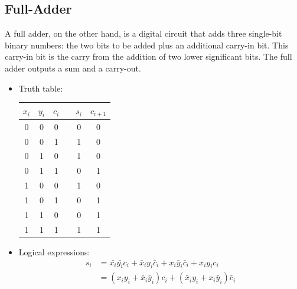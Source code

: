 \documentclass[12pt,openany]{book}
\begin{document}
			      	\subsection{Full-Adder}
			      	A full adder, on the other hand, is a digital circuit that adds three single-bit binary numbers: the two bits to be added plus an additional carry-in bit. This carry-in bit is the carry from the addition of two lower significant bits. The full adder outputs a sum and a carry-out.
			      	
			      	\begin{itemize}
			      		\item[] Truth table:
			      		      \begin{center}
			      		      	\begin{tabular}{cccc|cc}
			      		      		\( x_i \) & \( y_i \) & \( c_i \) &   & \( s_i \) & \( c_{i+1} \) \\
			      		      		\hline
			      		      		0         & 0         & 0         &   & 0         & 0             \\
			      		      		0         & 0         & 1         &   & 1         & 0             \\
			      		      		0         & 1         & 0         &   & 1         & 0             \\
			      		      		0         & 1         & 1         &   & 0         & 1             \\
			      		      		1         & 0         & 0         &   & 1         & 0             \\
			      		      		1         & 0         & 1         &   & 0         & 1             \\
			      		      		1         & 1         & 0         &   & 0         & 1             \\
			      		      		1         & 1         & 1         &   & 1         & 1             \\
			      		      	\end{tabular}
			      		      \end{center}
			      		\item[] Logical expressions:
			      		      \begin{align*}
			      		      	s_i     & = \bar{x_i}\bar{y_i} c_i + \bar{x}_i y_i \bar{c}_i + x_i \bar{y}_i \bar{c}_i + x_i y_i c_i \\
			      		      	        & = (x_i y_i + \bar{x}_i \bar{y}_i)c_i + (\bar{x}_i y_i + x_i \bar{y}_i)\bar{c}_i            \\

\end{align*}
\end{itemize}
\end{document}
